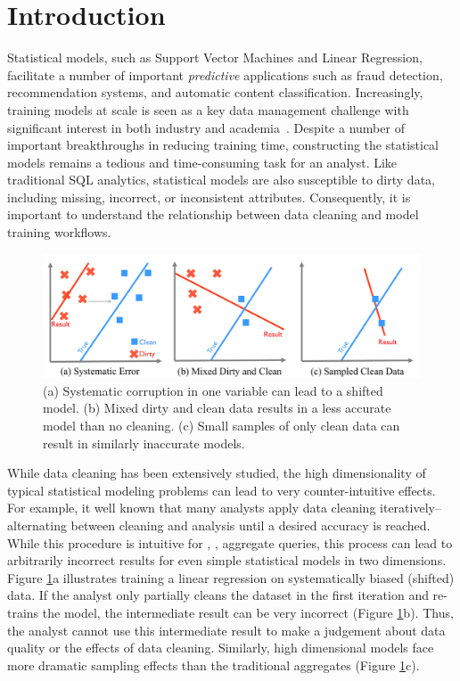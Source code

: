 \section{Introduction}
Statistical models, such as Support Vector Machines and Linear Regression, facilitate a number of important \emph{predictive} applications such as fraud detection, recommendation systems, and automatic content classification.
Increasingly, training models at scale is seen as a key data management challenge with significant interest in both industry and academia~\cite{bdas, alexandrov2014stratosphere, crotty2014tupleware, tensor}.    
Despite a number of important breakthroughs in reducing training time, constructing the statistical models remains a tedious and time-consuming task for an analyst. 
Like traditional SQL analytics, statistical models are also susceptible to dirty data, including missing, incorrect, or inconsistent attributes.
Consequently, it is important to understand the relationship between data cleaning and model training workflows.

\begin{figure}[t]
\centering
 \includegraphics[width=\columnwidth]{figs/update-arch.png}
 \caption{(a) Systematic corruption in one variable can lead to a shifted model. 
 (b) Mixed dirty and clean data results in a less accurate model than no cleaning.
(c) Small samples of only clean data can result in similarly inaccurate models. \label{update-arch1}}
\end{figure}

While data cleaning has been extensively studied, the high dimensionality of typical statistical modeling problems can lead to very counter-intuitive effects.
For example, it well known that many analysts apply data cleaning iteratively--alternating between cleaning and analysis until a desired accuracy is reached.
While this procedure is intuitive for \sumfunc, \countfunc, \avgfunc aggregate queries, this process can lead to arbitrarily incorrect results for even simple statistical models in two dimensions.
Figure \ref{update-arch1}a illustrates training a linear regression on systematically biased (shifted) data.
If the analyst only partially cleans the dataset in the first iteration and re-trains the model, the intermediate result can be very incorrect (Figure \ref{update-arch1}b).
Thus, the analyst cannot use this intermediate result to make a judgement about data quality or the effects of data cleaning. 
Similarly, high dimensional models face more dramatic sampling effects than the traditional aggregates (Figure \ref{update-arch1}c).

